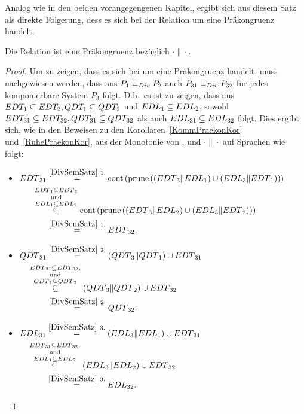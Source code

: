 Analog wie in den beiden vorangegengenen Kapitel, ergibt sich aus diesem Satz
als direkte Folgerung, dess es sich bei der Relation \DRel{} um eine
Präkongruenz handelt.

\begin{Kor}
  Die Relation \DRel{} ist eine Präkongruenz bezüglich $\cdot\|\cdot$.
\end{Kor}
\begin{proof}
  Um zu zeigen, dass es sich bei \DRel{} um eine Präkongruenz handelt, muss
  nachgewiesen werden, dass aus $P_1 \sqsubseteq  _{Div} P_2$ auch $P_{31} \sqsubseteq  _{Div} P_{32}$ für
  jedes komponierbare System $P_3$ folgt. D.h.\ es ist zu zeigen, dass aus
  $EDT _1\subseteq EDT _2, QDT _1\subseteq QDT _2$ und $EDL _1\subseteq EDL
  _2$, sowohl $EDT _{31} \subseteq EDT _{32}, QDT _{31} \subseteq QDT
  _{32}$ als auch $EDL _{31}\subseteq EDL _{32}$ folgt. Dies ergibt sich, wie
  in den Beweisen zu den Korollaren~\ref{KommPraekonKor}
  und~\ref{RuhePraekonKor}, aus der Monotonie von \cont{}, \prune{} und
  $\cdot\|\cdot$ auf Sprachen wie folgt:
  \begin{itemize}
    \item $\begin{aligned}[t]
        \EDT{}_{31} &\overset{\ref{DivSemSatz}~1.}{=}
        \cont{}\left(\prune{}\left(\left(\EDT{}_3\|\EDL{}_1\right) \cup
        \left(\EDL{}_3\|\EDT{}_1\right)\right)\right)\\
        &\hspace{-0.6cm}\overset{\EDT{}_1\subseteq
      \EDT{}_2}{\overset{\mathrm{und}}{\overset{\EDL{}_1\subseteq
    \EDL{}_2}{\subseteq}}}
    \cont{}\left(\prune{}\left(\left(\EDT{}_3\|\EDL{}_2\right) \cup
        \left(\EDL{}_3\|\EDT{}_2\right)\right)\right)\\
      &\overset{\ref{DivSemSatz}~1.}{=} \EDT{}_{32},
    \end{aligned}$
    \item $\begin{aligned}[t]
        \QDT{}_{31} &\overset{\ref{DivSemSatz}~2.}{=} (\QDT{}_3\|\QDT{}_1)
        \cup \EDT{}_{31}\\
        &\hspace{-0.8cm}\overset{\EDT{}_{31}\subseteq
      \EDT{}_{32},}{\overset{\mathrm{und}}{\overset{\QDT{}_1\subseteq
      \QDT{}_2}{\subseteq}}} (\QDT{}_3\|\QDT{}_2) \cup \EDT{}_{32}\\
      &\overset{\ref{DivSemSatz}~2.}{=} \QDT{}_{32}.
    \end{aligned}$
    \item $\begin{aligned}[t]
        \EDL{}_{31} &\overset{\ref{DivSemSatz}~3.}{=} (\EDL{}_3\|\EDL{}_1)
        \cup \EDT{}_{31}\\
        &\hspace{-0.8cm}\overset{\EDT{}_{31}\subseteq
      \EDT{}_{32},}{\overset{\mathrm{und}}{\overset{\EDL{}_1\subseteq
      \EDL{}_2}{\subseteq}}} (\EDL{}_3\|\EDL{}_2) \cup \EDT{}_{32}\\
      &\overset{\ref{DivSemSatz}~3.}{=} \EDL{}_{32}.
    \end{aligned}$
  \end{itemize}
\end{proof}


